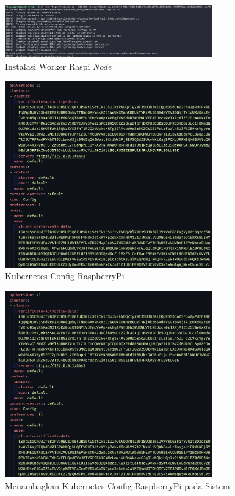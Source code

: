 \begin{figure}[ht]
  \centering
  \includegraphics[width=0.8\textwidth]{resources/chapter-4/pengujian/raspi-04.jpg}
  \caption{Instalasi Worker Raspi \textit{Node}}
  \label{fig:instalasi-worker-raspi-node}
\end{figure}

\begin{figure}[ht]
  \centering
  \includegraphics[width=0.8\textwidth]{resources/chapter-4/pengujian/raspi-kube-config.jpg}
  \caption{Kubernetes Config RaspberryPi}
  \label{fig:raspi-kube-config}
\end{figure}

\begin{figure}[ht]
  \centering
  \includegraphics[width=0.8\textwidth]{resources/chapter-4/pengujian/raspi-kube-config.jpg}
  \caption{Menambagkan Kubernetes Config RaspberryPi pada Sistem}
  \label{fig:raspi-add-kubeconfig}
\end{figure}

